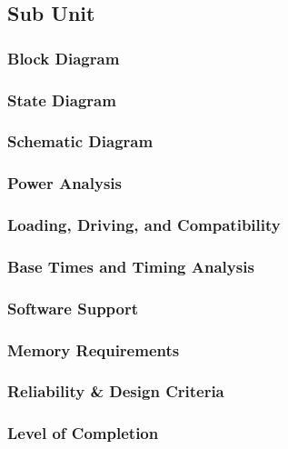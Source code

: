 \subsection{Sub Unit}
\subsubsection{Block Diagram}
\subsubsection{State Diagram}
\subsubsection{Schematic Diagram}
\subsubsection{Power Analysis}
\subsubsection{Loading, Driving, and Compatibility}
\subsubsection{Base Times and Timing Analysis}
\subsubsection{Software Support}
\subsubsection{Memory Requirements}
\subsubsection{Reliability \& Design Criteria}
\subsubsection{Level of Completion}
